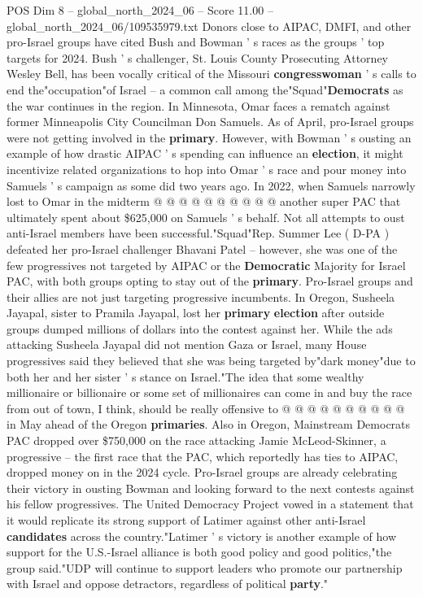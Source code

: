 \begin{textsample}{POS Dim 8 – global\_north\_2024\_06 – Score 11.00 – global\_north\_2024\_06/109535979.txt}
Donors close to AIPAC, DMFI, and other pro-Israel groups have cited Bush and Bowman ' s races as the groups ' top targets for 2024.
Bush ' s challenger, St.
Louis County Prosecuting Attorney Wesley Bell, has been vocally critical of the Missouri \textbf{congresswoman} ' s calls to end the"occupation"of Israel -- a common call among the"Squad"\textbf{Democrats} as the war continues in the region.
In Minnesota, Omar faces a rematch against former Minneapolis City Councilman Don Samuels.
As of April, pro-Israel groups were not getting involved in the \textbf{primary}.
However, with Bowman ' s ousting an example of how drastic AIPAC ' s spending can influence an \textbf{election}, it might incentivize related organizations to hop into Omar ' s race and pour money into Samuels ' s campaign as some did two years ago.
In 2022, when Samuels narrowly lost to Omar in the midterm @ @ @ @ @ @ @ @ @ @ another super PAC that ultimately spent about \$625,000 on Samuels ' s behalf.
Not all attempts to oust anti-Israel members have been successful."Squad"Rep.
Summer Lee ( D-PA ) defeated her pro-Israel challenger Bhavani Patel -- however, she was one of the few progressives not targeted by AIPAC or the \textbf{Democratic} Majority for Israel PAC, with both groups opting to stay out of the \textbf{primary}.
Pro-Israel groups and their allies are not just targeting progressive incumbents.
In Oregon, Susheela Jayapal, sister to Pramila Jayapal, lost her \textbf{primary} \textbf{election} after outside groups dumped millions of dollars into the contest against her.
While the ads attacking Susheela Jayapal did not mention Gaza or Israel, many House progressives said they believed that she was being targeted by"dark money"due to both her and her sister ' s stance on Israel."The idea that some wealthy millionaire or billionaire or some set of millionaires can come in and buy the race from out of town, I think, should be really offensive to @ @ @ @ @ @ @ @ @ @ in May ahead of the Oregon \textbf{primaries}.
Also in Oregon, Mainstream Democrats PAC dropped over \$750,000 on the race attacking Jamie McLeod-Skinner, a progressive -- the first race that the PAC, which reportedly has ties to AIPAC, dropped money on in the 2024 cycle.
Pro-Israel groups are already celebrating their victory in ousting Bowman and looking forward to the next contests against his fellow progressives.
The United Democracy Project vowed in a statement that it would replicate its strong support of Latimer against other anti-Israel \textbf{candidates} across the country."Latimer ' s victory is another example of how support for the U.S.-Israel alliance is both good policy and good politics,"the group said."UDP will continue to support leaders who promote our partnership with Israel and oppose detractors, regardless of political \textbf{party}."

\end{textsample}
